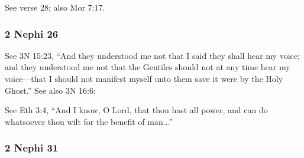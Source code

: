 \begin{compactdesc}
		\item[29$\vert$]
		\begin{compactdesc}
		\item[the right way is to believe in Christ...] See verse 28; also Mor 7:17.
		\end{compactdesc}

		\end{compactdesc}
		
	\subsubsection{2 Nephi 26} %
	
		\begin{compactdesc}
		
		\item[13$\vert$]
		\begin{compactdesc}
		\item[manifesteth himself...by the power of the Holy Ghost] See 3N 15:23, ``And they understood me not that I said they shall hear my voice; and they understood me not that the Gentiles should not at any time hear my voice---that I should not manifest myself unto them save it were by the Holy Ghost.'' See also 3N 16:6;
		\end{compactdesc}
		
		\item[24$\vert$]
		\begin{compactdesc}
		\item[he doeth not anything save it be for the benefit of the world] See Eth 3:4, ``And I know, O Lord, that thou hast all power, and can do whatsoever thou wilt for the benefit of man...''
		\end{compactdesc}
		
		\end{compactdesc}
		
	\subsubsection{2 Nephi 31} %
	
